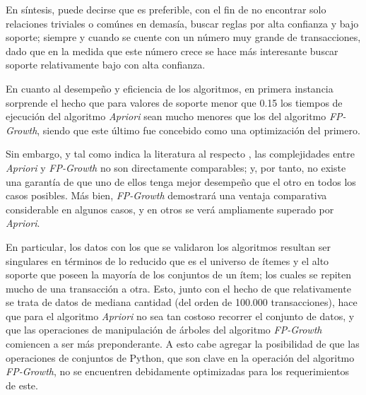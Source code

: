 En síntesis, puede decirse que es preferible, con el fin de no encontrar solo relaciones triviales o comúnes en demasía, buscar reglas por alta confianza y bajo soporte; siempre y cuando se cuente con un número muy grande de transacciones, dado que en la medida que este número crece se hace más interesante buscar soporte relativamente bajo con alta confianza.

En cuanto al desempeño y eficiencia de los algoritmos, en primera instancia sorprende el hecho que para valores de soporte menor que 0.15 los tiempos de ejecución del algoritmo \textit{Apriori} sean mucho menores que los del algoritmo \textit{FP-Growth}, siendo que este último fue concebido como una optimización del primero. 

Sin embargo, y tal como indica la literatura al respecto \cite{kosters2003complexity}, las complejidades entre \textit{Apriori} y \textit{FP-Growth} no son directamente comparables; y, por tanto, no existe una garantía de que uno de ellos tenga mejor desempeño que el otro en todos los casos posibles. Más bien, \textit{FP-Growth} demostrará una ventaja comparativa considerable en algunos casos, y en otros se verá ampliamente superado por \textit{Apriori}.

En particular, los datos con los que se validaron los algoritmos resultan ser singulares en términos de lo reducido que es el universo de ítemes y el alto soporte que poseen la mayoría de los conjuntos de un ítem; los cuales se repiten mucho de una transacción a otra. Esto, junto con el hecho de que relativamente se trata de datos de mediana cantidad (del orden de 100.000 transacciones), hace que para el algoritmo \textit{Apriori} no sea tan costoso recorrer el conjunto de datos, y que las operaciones de manipulación de árboles del algoritmo \textit{FP-Growth} comiencen a ser más preponderante. A esto cabe agregar la posibilidad de que las operaciones de conjuntos de Python, que son clave en la operación del algoritmo \textit{FP-Growth}, no se encuentren debidamente optimizadas para los requerimientos de este.
